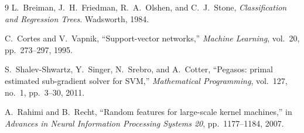 \documentclass[10pt,twocolumn,a4paper]{article}
\begin{document}
\begin{thebibliography}{9}
L.~Breiman, J.~H.~Friedman, R.~A.~Olshen, and C.~J.~Stone,
\emph{Classification and Regression Trees}.
Wadsworth, 1984.

C.~Cortes and V.~Vapnik,
``Support-vector networks,''
\emph{Machine Learning}, vol.~20, pp.~273--297, 1995.

S.~Shalev-Shwartz, Y.~Singer, N.~Srebro, and A.~Cotter,
``Pegasos: primal estimated sub-gradient solver for SVM,''
\emph{Mathematical Programming}, vol.~127, no.~1, pp.~3--30, 2011.

A.~Rahimi and B.~Recht,
``Random features for large-scale kernel machines,''
in \emph{Advances in Neural Information Processing Systems 20},
pp.~1177--1184, 2007.
\end{thebibliography}
\end{document}
